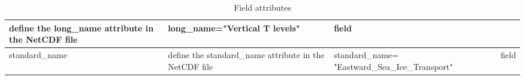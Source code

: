 \documentclass[../tex_main/NEMO_manual]{subfiles}
\begin{document}
\begin{table}
\begin{tabularx}{\textwidth}{|l|X|l|l|}
		define the long\_name attribute in the NetCDF file                                                   &
		long\_name="Vertical T levels"                                                                       &
		field                                  \\ \hline
		standard\_name                                                                                       &
		define the standard\_name attribute in the NetCDF file                                               &
		standard\_name= "Eastward\_Sea\_Ice\_Transport"                                                      &
		field                                  \\ \hline
	\end{tabularx}
	\caption{Field attributes}
\end{table}
\end{document}

